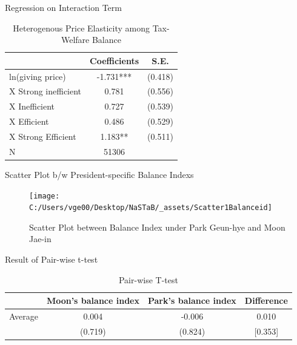 \documentclass[
  ignorenonframetext,
]{beamer}
\begin{document}
\begin{frame}{Regression on Interaction Term}
\protect\hypertarget{regression-on-interaction-term-1}{}
\begin{table}

\caption{\label{tab:kableEstimateInteractionByBalanceGroup}Heterogenous Price Elasticity among Tax-Welfare Balance}
\centering
\begin{tabular}[t]{lcc}
\toprule
 & Coefficients & S.E.\\
\midrule
ln(giving price) & -1.731*** & (0.418)\\
\hspace{1em}X Strong inefficient & 0.781 & (0.556)\\
\hspace{1em}X Inefficient & 0.727 & (0.539)\\
\hspace{1em}X Efficient & 0.486 & (0.529)\\
\hspace{1em}X Strong Efficient & 1.183** & (0.511)\\
N & 51306 & \\
\bottomrule
\end{tabular}
\end{table}
\end{frame}

\begin{frame}{Scatter Plot b/w President-specific Balance Indexs}
\protect\hypertarget{scatter-plot-bw-president-specific-balance-indexs}{}
\begin{figure}
\texttt{[image: C:/Users/vge00/Desktop/NaSTaB/\_assets/Scatter1Balanceid]} \caption{Scatter Plot between Balance Index under Park Geun-hye and Moon Jae-in}\label{fig:unnamed-chunk-11}
\end{figure}
\end{frame}

\begin{frame}{Result of Pair-wise t-test}
\protect\hypertarget{result-of-pair-wise-t-test-1}{}
\begin{table}

\caption{\label{tab:kableTtestPresidentBalanceid}Pair-wise T-test}
\centering
\fontsize{9}{11}\selectfont
\begin{tabular}[t]{lccc}
\toprule
 & Moon's balance index & Park's balance index & Difference\\
\midrule
Average & 0.004 & -0.006 & 0.010\\
 & (0.719) & (0.824) & [0.353]\\
\bottomrule
\end{tabular}
\end{table}
\end{frame}
\end{document}
